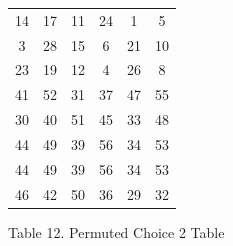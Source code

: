 \documentclass[11pt]{article}
\begin{document}
\begin{center}
\begin{tabular}{ | c | c | c | c | c | c |}
  \hline
    14&	17&	11&	24& 1& 5\\
    3&	28&	15&	6& 21& 10\\
    23&	19&	12&	4& 26& 8\\
    41&	52&	31&	37& 47& 55\\
    30&	40&	51&	45& 33& 48\\
    44&	49&	39&	56& 34& 53\\
    44&	49&	39&	56& 34& 53\\
    46&	42&	50&	36& 29& 32\\
  \hline
\end{tabular}
\end{center}
\begin{center}
Table 12. Permuted Choice 2 Table
\end{center}
\end{document}
